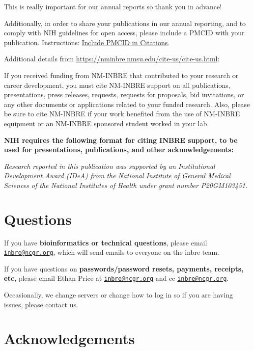 \documentclass[
]{book}
\begin{document}
This is really important for our annual reports so thank you in advance!

Additionally, in order to share your publications in our annual reporting, and to comply with NIH guidelines for open access, please include a PMCID with your publication. Instructions: \href{https://publicaccess.nih.gov/include-pmcid-citations.htm}{Include PMCID in Citations}.

Additional details from \url{https://nminbre.nmsu.edu/cite-us/cite-us.html}:

{If you received funding from NM-INBRE that contributed to your research or career development, you must cite NM-INBRE support on all publications, presentations, press releases, requests, requests for proposals, bid invitations, or any other documents or applications related to your funded research. Also, please be sure to cite NM-INBRE if your work benefited from the use of NM-INBRE equipment or an NM-INBRE sponsored student worked in your lab.}

{\textbf{NIH requires the following format for citing INBRE support, to be used for presentations, publications, and other acknowledgements:}}

{\emph{Research reported in this publication was supported by an Institutional Development Award (IDeA) from the National Institute of General Medical Sciences of the National Institutes of Health under grant number P20GM103451.}}

\hypertarget{questions}{%
\chapter*{Questions}\label{questions}}

If you have \textbf{bioinformatics or technical questions}, please email \href{mailto:inbre@ncgr.org}{\nolinkurl{inbre@ncgr.org}}, which will send emails to everyone on the inbre team.

If you have questions on \textbf{passwords/password resets, payments, receipts, etc,} please email Ethan Price at \href{mailto:inbre@ncgr.org}{\nolinkurl{inbre@ncgr.org}} and cc \href{mailto:inbre@ncgr.org}{\nolinkurl{inbre@ncgr.org}}.

Occasionally, we change servers or change how to log in so if you are having issues, please contact us.

\hypertarget{acknowledgements}{%
\chapter*{Acknowledgements}\label{acknowledgements}}
\end{document}

